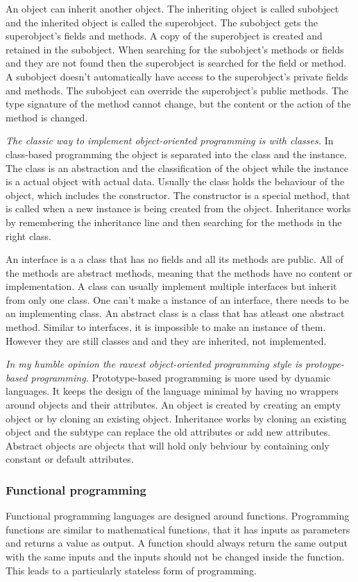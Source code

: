 An object can inherit another object. The inheriting object is called subobject and the inherited object is called the superobject. The subobject gets the superobject's fields and methods. A copy of the superobject is created and retained in the subobject. When searching for the subobject's methods or fields and they are not found then the superobject is searched for the field or method. A subobject doesn't automatically have access to the superobject's private fields and methods. The subobject can override the superobject's public methods. The type signature of the method cannot change, but the content or the action of the method is changed.

\emph{The classic way to implement object-oriented programming is with classes.} In class-based programming the object is separated into the class and the instance. The class is an abstraction and the classification of the object while the instance is a actual object with actual data. Usually the class holds the behaviour of the object, which includes the constructor. The constructor is a special method, that is called when a new instance is being created from the object. Inheritance works by remembering the inheritance line and then searching for the methods in the right class.

An interface is a a class that has no fields and all its methods are public. All of the methods are abstract methods, meaning that the methods have no content or implementation. A class can usually implement multiple interfaces but inherit from only one class. One can't make a instance of an interface, there needs to be an implementing class. An abstract class is a class that has atleast one abstract method. Similar to interfaces, it is impossible to make an instance of them. However they are still classes and and they are inherited, not implemented.

\emph{In my humble opinion the rawest object-oriented programming style is protoype-based programming.} Prototype-based programming is more used by dynamic languages. It keeps the design of the language minimal by having no wrappers around objects and their attributes. An object is created by creating an empty object or by cloning an existing object. Inheritance works by cloning an existing object and the subtype can replace the old attributes or add new attributes. Abstract objects are objects that will hold only behviour by containing only constant or default attributes.

\subsubsection{Functional programming}
Functional programming languages are designed around functions. Programming functions are similar to mathematical functions, that it has inputs as parameters and returns a value as output. A function should always return the same output with the same inputs and the inputs should not be changed inside the function. This leads to a particularly stateless form of programming.

